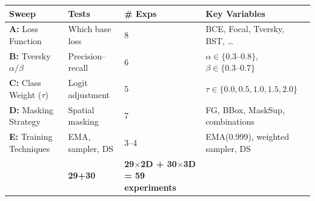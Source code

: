 \documentclass[border=10pt]{standalone}
\begin{document}
\renewcommand{\arraystretch}{1.7}
\large
\begin{tabular}{L{5.5cm} C{3.5cm} C{2.5cm} L{7.5cm}}
\toprule
{}
\textcolor{headfg}{\textbf{Sweep}} &
\textcolor{headfg}{\textbf{Tests}} &
\textcolor{headfg}{\textbf{\# Exps}} &
\textcolor{headfg}{\textbf{Key Variables}} \\
\midrule
{}
\textbf{A:} Loss Function &
Which base loss &
8 &
BCE, Focal, Tversky, BST, \ldots \\
\textbf{B:} Tversky $\alpha/\beta$ &
Precision--recall &
6 &
$\alpha \in \{0.3\text{--}0.8\}$, $\beta \in \{0.3\text{--}0.7\}$ \\
\textbf{C:} Class Weight ($\tau$) &
Logit adjustment &
5 &
$\tau \in \{0.0, 0.5, 1.0, 1.5, 2.0\}$ \\
\textbf{D:} Masking Strategy &
Spatial masking &
7 &
FG, BBox, MaskSup, combinations \\
\textbf{E:} Training Techniques &
EMA, sampler, DS &
3--4 &
EMA(0.999), weighted sampler, DS \\
\midrule
{}
 &
\textbf{29+30} &
\textbf{29$\times$2D + 30$\times$3D = 59 experiments} \\
\bottomrule
\end{tabular}
\end{document}
